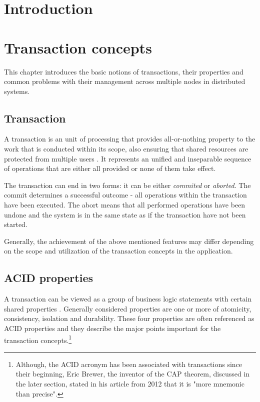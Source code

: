 \documentclass[oneside,
  digital, %
  table,   %
  nolof,     %
  nolot,     %
]{fithesis3}
\begin{document}
\chapter{Introduction}

\clearpage
\chapter{Transaction concepts}

This chapter introduces the basic notions of transactions, their properties and common problems with their management across multiple nodes in distributed systems. 

\section{Transaction}

A transaction is an unit of processing that provides all-or-nothing property to the work that is conducted within its scope, also ensuring that shared resources are protected from multiple users \cite{java_tran_processing}. It represents an unified and inseparable sequence of operations that are either all provided or none of them take effect. 

The transaction can end in two forms: it can be either \textit{commited} or \textit{aborted}. The commit determines a successful outcome - all operations within the transaction have been executed. The abort means that all performed operations have been undone and the system is in the same state as if the transaction have not been started.

Generally, the achievement of the above mentioned features may differ depending on the scope and utilization of the transaction concepts in the application.

\section{ACID properties}

A transaction can be viewed as a group of business logic statements with certain shared properties \cite{nar_wf}. Generally considered properties are one or more of atomicity, consistency, isolation and durability. These four properties are often referenced as ACID properties \cite{haerder_reuter_1983} and they describe the major points important for the transaction concepts.\footnote{Although, the ACID acronym has been associated with transactions since their beginning, Eric Brewer, the inventor of the CAP theorem, discussed in the later section, stated in his article from 2012 that it is "more mnemonic than precise".\cite{cap_12years}}
\end{document}
